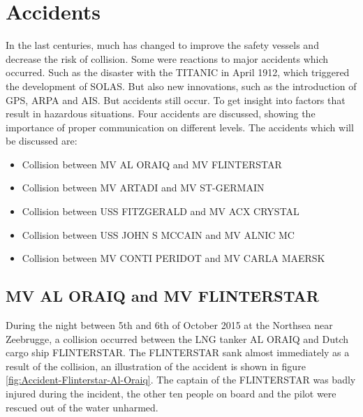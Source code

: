 \chapter{Accidents}
\label{app:accidents}
In the last centuries, much has changed to improve the safety vessels and decrease the risk of collision. Some were reactions to major accidents which occurred. Such as the disaster with the TITANIC in April 1912, which triggered the development of \ac{SOLAS}. But also new innovations, such as the introduction of \ac{GPS}, \ac{ARPA} and \ac{AIS}. But accidents still occur. To get insight into factors that result in hazardous situations. Four accidents are discussed, showing the importance of proper communication on different levels. The accidents which will be discussed are:
\begin{itemize}
	\item Collision between MV AL ORAIQ and MV FLINTERSTAR
	\item Collision between MV ARTADI and MV ST-GERMAIN
	\item Collision between USS FITZGERALD and MV ACX CRYSTAL
	\item Collision between USS JOHN S MCCAIN and MV ALNIC MC
	\item Collision between MV CONTI PERIDOT and MV CARLA MAERSK
\end{itemize}

\newpage
\section{MV AL ORAIQ and MV FLINTERSTAR}
\label{sec:al-oraiq-vs-flinterstar}
During the night between 5th and 6th of October 2015 at the Northsea near Zeebrugge, a collision occurred between the LNG tanker AL ORAIQ and Dutch cargo ship FLINTERSTAR. The FLINTERSTAR sank almost immediately as a result of the collision, an illustration of the accident is shown in figure \ref{fig:Accident-Flinterstar-Al-Oraiq}. The captain of the FLINTERSTAR was badly injured during the incident, the other ten people on board and the pilot were rescued out of the water unharmed.

